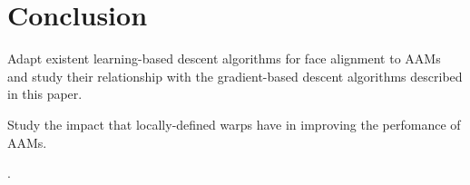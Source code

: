 \section{Conclusion}
\label{sec:conc}

\begin{inparaenum}
\item Adapt existent learning-based descent algorithms for face alignment to AAMs and study their relationship with the gradient-based descent algorithms described in this paper. 
\item Study the impact that locally-defined warps have in improving the perfomance of AAMs.  
\end{inparaenum}. 